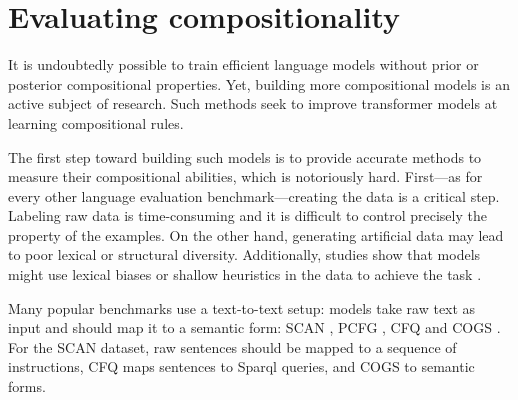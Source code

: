 
\section{Evaluating compositionality}

It is undoubtedly possible to train efficient language models without prior or posterior compositional properties. Yet, building more compositional models is an active subject of research. Such methods seek to improve transformer models at learning compositional rules.

The first step toward building such models is to provide accurate methods to measure their compositional abilities, which is notoriously hard. First—as for every other language evaluation benchmark—creating the data is a critical step. Labeling raw data is time-consuming and it is difficult to control precisely the property of the examples. On the other hand, generating artificial data may lead to poor lexical or structural diversity. Additionally, studies show that models might use lexical biases or shallow heuristics in the data to achieve the task \parencite{linzen_18}. 

Many popular benchmarks use a text-to-text setup: models take raw text as input and should map it to a semantic form: SCAN \parencite{lake_18}, PCFG \parencite{hupkes_20}, CFQ \parencite{keysers_20} and COGS \parencite{kim_20}. For the SCAN dataset, raw sentences should be mapped to a sequence of instructions, CFQ maps sentences to Sparql queries, and COGS to semantic forms.

